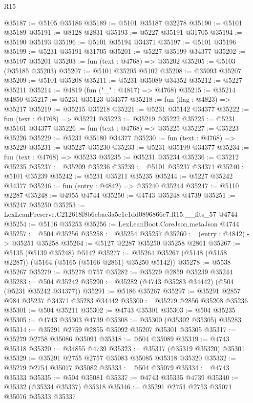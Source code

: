 \begin{lexlean}{R15}
\begin{coremodule}
{{{{{{{{{{{@35187 := @5105 @35186
@35189 := @5101 @35187 @32278
@35190 := @5101 @35189
@35191 := @8128 @2831
@35193 := @5227 @35191 @31705
@35194 := @35190 @35193
@35196 := @5101 @35194 @34371
@35197 := @5101 @35196
@35199 := @5231 @35191 @31705
@35201 := @5227 @35199 @34377
@35202 := @35197 @35201
@35203 := fun (text : @4768) => @35202
@35205 := @5103 (@35185 @35203)
@35207 := @5101 @35205 @5102
@35208 := @35093 @35207
@35209 := @5101 @35208
@35211 := @5231 @35089 @34352
@35212 := @5227 @35211
@35214 := @4819 (fun ("_" : @4817) => @4768)
@35215 := @35214 @4850
@35217 := @5231 @35123 @34377
@35218 := fun (flag : @4823) => @35217
@35219 := @35215 @35218
@35221 := @5231 @35142 @34377
@35222 := fun (text : @4768) => @35221
@35223 := @35219 @35222
@35225 := @5231 @35161 @34377
@35226 := fun (text : @4768) => @35225
@35227 := @35223 @35226
@35229 := @5231 @35180 @34377
@35230 := fun (text : @4768) => @35229
@35231 := @35227 @35230
@35233 := @5231 @35199 @34377
@35234 := fun (text : @4768) => @35233
@35235 := @35231 @35234
@35236 := @35212 @35235
@35237 := @35209 @35236
@35239 := @5101 @35237 @34371
@35240 := @5101 @35239
@35242 := @5231 @35211 @35235
@35244 := @5227 @35242 @34377
@35246 := fun (entry : @4842) => @35240 @35244
@35247 := @5110 @2287
@35248 := @4955 @4744
@35250 := @4743 @35248 @4739
@35251 := @35247 @35250
@35253 := LexLeanPreserve.C212618f8b6ebac3a5c1e1dd0896866e7.R15.__fits_57 @4744
@35254 := @5116 @35253
@35256 := LexLeanBoot.CoreJson.metaJson @4744
@35257 := @504 @35256
@35258 := @35254 @35257
@35260 := (entry : @4842) -> @35251 @35258
@35264 := @5127 @2287 @35250 @35258 @2861
@35267 := @5135 (@5139 @35248) @5142
@35277 := @35264 @35267 (@5148 (@5158 @2287)) (@5164 (@5165 (@5166 @2861) @35250 @5142))
@35278 := @5538 @35267
@35279 := @35278 @757
@35282 := @35279 @2859 @35239 @35244
@35283 := @504 @35242
@35290 := @35282 (@4743 @35283 @34442) (@504 (@5231 @35242 @34377))
@35291 := @5186 @35267
@35297 := @35291 @2857 @984 @35237 @34371 @35283 @34442
@35300 := @35279 @2856 @35208 @35236
@35301 := @504 @35211
@35302 := @4743 @35301
@35303 := @504 @35235
@35305 := @4743 @35303 @4739
@35308 := @35300 (@35302 @35305) @35283
@35314 := @35291 @2759 @2855 @35092 @35207 @35301 @35305
@35317 := @35279 @2758 @35086 @35091
@35318 := @504 @35089
@35319 := @4743 @35318
@35320 := @34855 @4739
@35323 := @35317 (@35319 @35320) @35301
@35329 := @35291 @2755 @2757 @35083 @35085 @35318 @35320
@35332 := @35279 @2754 @35077 @35082
@35333 := @504 @35079
@35334 := @4743 @35333
@35335 := @504 @35081
@35337 := @4743 @35335 @4739
@35340 := @35332 (@35334 @35337) @35318
@35346 := @35291 @2751 @2753 @35071 @35076 @35333 @35337
}}}}}}}}}}}
\end{coremodule}
\end{lexlean}
